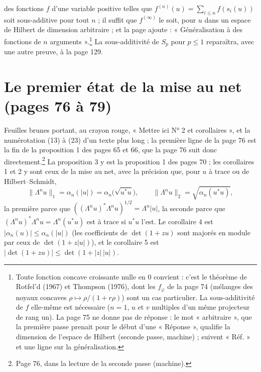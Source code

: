 \documentclass[11pt,a4paper]{article}
\begin{document}
des fonctions $f$ d'une variable positive telles que $f^{(n)}(u) = \sum_{i
\leq n} f(s_i(u))$ soit sous-additive pour tout $n$ ; il suffit que
$f^{(\infty)}$ le soit, pour $u$ dans un espace de Hilbert de dimension
arbitraire ; et la page ajoute : « Généralisation à des fonctions de $n$
arguments ».\footnote{Toute fonction concave croissante nulle en $0$ convient :
c'est le théorème de Rotfel'd (1967) et Thompson (1976), dont les
$f_\varphi$ de la page 74 (mélanges des noyaux concaves $\rho \mapsto
\rho/(1 + r\rho)$) sont un cas particulier. La sous-additivité de $f$
elle-même est nécessaire ($n = 1$, $u$ et $v$ multiples d'un même projecteur
de rang un). La page 75 ne donne pas de réponse : le mot « arbitraire », que
la première passe prenait pour le début d'une « Réponse », qualifie la
dimension de l'espace de Hilbert (seconde passe, machine) ; suivent « Réf. »
et une ligne sur la généralisation.} La sous-additivité de $S_p$ pour $p \leq
1$ reparaîtra, avec une autre preuve, à la page 129.

\section*{Le premier état de la mise au net (pages 76 à 79)}

Feuilles brunes portant, au crayon rouge, « Mettre ici N° 2 et
corollaires », et la numérotation (13) à (23) d'un texte plus long ; la
première ligne de la page 76 est la fin de la proposition 1 des pages 65 et
66, que la page 76 suit donc directement.\footnote{Page 76, dans la lecture
de la seconde passe (machine).} La proposition 3 y est
la proposition 1 des pages 70 ; les corollaires 1 et 2 y sont ceux de la
mise au net, avec la précision que, pour $u$ à trace ou de Hilbert--Schmidt,
\[
  \|\Lambda^n u\|_1 = \alpha_n(|u|) = \alpha_n\bigl(\sqrt{u^{*}u}\bigr), \qquad
  \|\Lambda^n u\|_2 = \sqrt{\alpha_n(u^{*}u)},
\]
la première parce que $((\Lambda^n u)^{*}\Lambda^n u)^{1/2} = \Lambda^n |u|$,
la seconde parce que $(\Lambda^n u)^{*}\Lambda^n u = \Lambda^n(u^{*}u)$ est à
trace si $u^{*}u$ l'est. Le corollaire 4 est $|\alpha_n(u)| \leq
\alpha_n(|u|)$ (les coefficients de $\det(1+zu)$ sont majorés en module
par ceux de $\det(1+z|u|)$), et le corollaire 5 est $|\det(1+zu)| \leq
\det(1 + |z|\,|u|)$.
\end{document}

